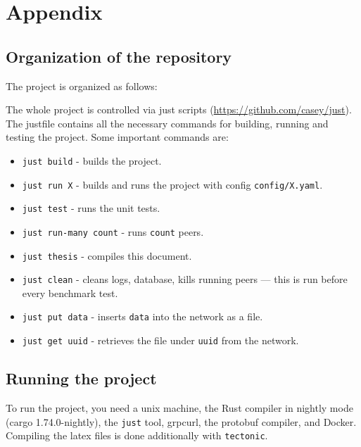 \appendix
\chapter{Appendix}
\label{appendix}

\section{Organization of the repository}

The project is organized as follows:


The whole project is controlled via just scripts (\url{https://github.com/casey/just}).
The justfile contains all the necessary commands for building, running and testing the project.
Some important commands are:
\begin{itemize}
    \item \texttt{just build} - builds the project.
    \item \texttt{just run X} - builds and runs the project with config \texttt{config/X.yaml}.
    \item \texttt{just test} - runs the unit tests.
    \item \texttt{just run-many count} - runs \texttt{count} peers.
    \item \texttt{just thesis} - compiles this document.
    \item \texttt{just clean} - cleans logs, database, kills running peers --- this is run before every benchmark test.
    \item \texttt{just put data} - inserts \texttt{data} into the network as a file.
    \item \texttt{just get uuid} - retrieves the file under \texttt{uuid} from the network.
\end{itemize}

\section{Running the project}

To run the project, you need a unix machine,
the Rust compiler in nightly mode (cargo 1.74.0-nightly),
the \texttt{just} tool, grpcurl, the protobuf compiler, and Docker.
Compiling the latex files is done additionally with \texttt{tectonic}.

